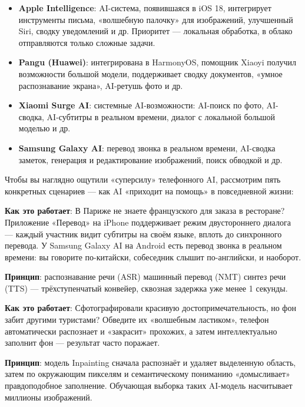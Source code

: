 \begin{itemize}
  \item \textbf{Apple Intelligence}: AI-система, появившаяся в iOS 18, интегрирует инструменты письма, «волшебную палочку» для изображений, улучшенный Siri, сводку уведомлений и др. Приоритет — локальная обработка, в облако отправляются только сложные задачи.
  \item \textbf{Pangu (Huawei)}: интегрирована в HarmonyOS, помощник Xiaoyi получил возможности большой модели, поддерживает сводку документов, «умное распознавание экрана», AI-ретушь фото и др.
  \item \textbf{Xiaomi Surge AI}: системные AI-возможности: AI-поиск по фото, AI-сводка, AI-субтитры в реальном времени, диалог с локальной большой моделью и др.
  \item \textbf{Samsung Galaxy AI}: перевод звонка в реальном времени, AI-сводка заметок, генерация и редактирование изображений, поиск обводкой и др.
\end{itemize}


Чтобы вы наглядно ощутили «суперсилу» телефонного AI, рассмотрим пять конкретных сценариев — как AI «приходит на помощь» в повседневной жизни:


\textbf{Как это работает}: В Париже не знаете французского для заказа в ресторане? Приложение «Перевод» на iPhone поддерживает режим двустороннего диалога — каждый участник видит субтитры на своём языке, вплоть до синхронного перевода. У Samsung Galaxy AI на Android есть перевод звонка в реальном времени: вы говорите по-китайски, собеседник слышит по-английски, и наоборот.

\textbf{Принцип}: распознавание речи (ASR) машинный перевод (NMT) синтез речи (TTS) — трёхступенчатый конвейер, сквозная задержка уже менее 1 секунды.


\textbf{Как это работает}: Сфотографировали красивую достопримечательность, но фон забит другими туристами? Обведите их «волшебным ластиком», телефон автоматически распознает и «закрасит» прохожих, а затем интеллектуально заполнит фон — результат часто поражает.

\textbf{Принцип}: модель Inpainting сначала распознаёт и удаляет выделенную область, затем по окружающим пикселям и семантическому пониманию «домысливает» правдоподобное заполнение. Обучающая выборка таких AI-модель насчитывает миллионы изображений.


